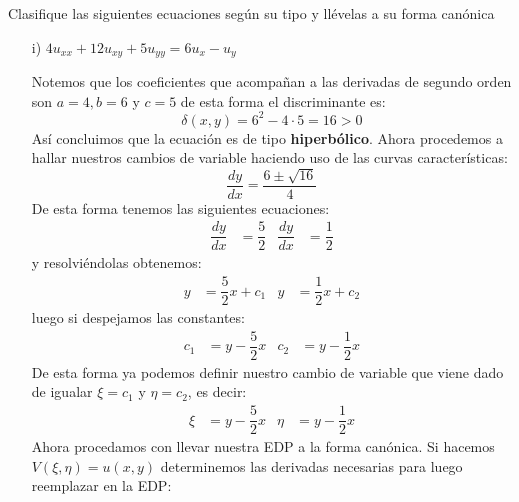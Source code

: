 
\usepackage{amsmath}
\usepackage{geometry}
\usepackage{tikz}
\usepackage{float}
\usepackage{graphics}



\maketitle
\thispagestyle{empty}
\newpage 
\begin{homeworkProblem}
    Clasifique las siguientes ecuaciones según su tipo y llévelas a su forma canónica
    \begin{itemize}
        \item [i)]$4u_{xx}+12u_{xy}+5u_{yy}=6u_x-u_y$
        \begin{solucion}
         Notemos que los coeficientes que acompañan a las derivadas de segundo orden son $a=4,b=6$ y $c=5$ de esta forma el discriminante es:
         $$\delta(x,y)=6^2-4\cdot5=16>0$$
         Así concluimos que la ecuación es de tipo \textbf{hiperbólico}. Ahora procedemos a hallar nuestros cambios de variable haciendo uso de las curvas características:
         $$\dfrac{dy}{dx}=\dfrac{6\pm\sqrt{16} }{4}$$
         De esta forma tenemos las siguientes ecuaciones:
         \begin{align*}
             \dfrac{dy}{dx}&=\dfrac{5}{2} &   \dfrac{dy}{dx}&=\dfrac{1}{2} 
             \end{align*}
             y resolviéndolas obtenemos:
             \begin{align*}
                 y&=\dfrac{5}{2}x+c_1 & y&=\dfrac{1}{2}x+c_2
             \end{align*}
             luego si despejamos las constantes:
             \begin{align*}
             c_1&=y-\dfrac{5}{2}x & c_2&=y-\dfrac{1}{2}x    
             \end{align*}
             De esta forma ya podemos definir nuestro cambio de variable que viene dado de igualar $\xi=c_1$ y $\eta=c_2$, es decir:
             \begin{align*}
             \xi&=y-\dfrac{5}{2}x & \eta&=y-\dfrac{1}{2}x    
             \end{align*}
             Ahora procedamos con llevar nuestra EDP a la forma canónica. Si hacemos \\$V(\xi,\eta)=u(x,y)$ determinemos las derivadas necesarias para luego reemplazar en la EDP:
             \begin{align*}

\end{align*}
\end{solucion}
\end{itemize}
\end{homeworkProblem}
